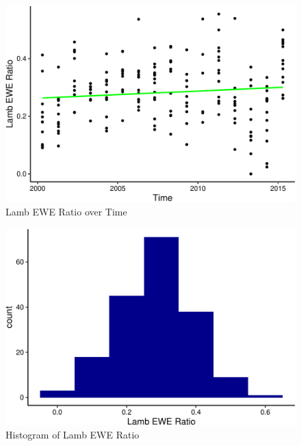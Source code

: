 \documentclass[
  12pt,
]{article}
\begin{document}
\newpage

\begin{figure}
\centering
\includegraphics{FastFajardoPlasynski_ENV872_Project_files/figure-latex/unnamed-chunk-2-1.pdf}
\caption{Lamb EWE Ratio over Time}
\end{figure}

\begin{figure}
\centering
\includegraphics{FastFajardoPlasynski_ENV872_Project_files/figure-latex/unnamed-chunk-3-1.pdf}
\caption{Histogram of Lamb EWE Ratio}
\end{figure}
\end{document}
